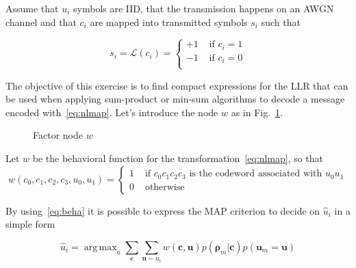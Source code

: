 \documentclass[10pt]{article}
\DeclareMathOperator*{\argmax}{arg\,max}
\begin{document}
Assume that $u_i$ symbols are IID, that the transmission happens on an AWGN channel and that $c_i$ are mapped into transmitted symbols $s_i$ such that

\begin{equation}\label{eq:lmap}
	s_i = \mathcal{L}(c_i) =
	\begin{cases}
		+1 & \mbox{ if } c_i = 1 \\
		-1 & \mbox{ if } c_i = 0 \\
	\end{cases}
\end{equation}

The objective of this exercise is to find compact expressions for the LLR that can be used when applying sum-product or min-sum algorithms to decode a message encoded with~\eqref{eq:nlmap}.
Let's introduce the node $w$ as in Fig.~\ref{fig:factornode}.
\begin{figure}[h]
\centering
{}
\caption{Factor node $w$}
\label{fig:factornode}
\end{figure}

Let $w$ be the behavioral function for the transformation~\eqref{eq:nlmap}, so that
\begin{equation}\label{eq:beha}
	w(c_0, c_1, c_2, c_3, u_0, u_1) =
	\begin{cases}
		1 & \mbox{ if } c_0c_1c_2c_3 \mbox{ is the codeword associated with } u_0u_1 \\
		0 & \mbox{ otherwise}
	\end{cases}
\end{equation}

By using~\eqref{eq:beha} it is possible to express the MAP criterion to decide on $\hat{u}_i$ in a simple form

\begin{equation}
	\hat{u}_i = \argmax_{a} \sum_{\mathbf{c}} \sum_{\mathbf{u} \sim u_i} w(\mathbf{c}, \mathbf{u}) p(\boldsymbol{\rho}_m | \mathbf{c}) p(\mathbf{u}_m = \mathbf{u})
\end{equation}
\end{document}
